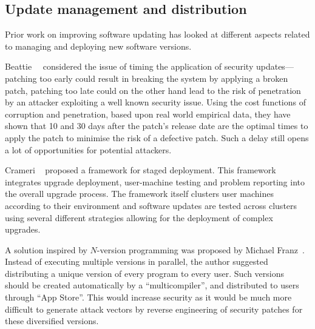 \subsection{Update management and distribution}

Prior work on improving software updating has looked at different aspects
related to managing and deploying new software versions.

Beattie~\etal~\cite{beattie2002} considered the issue of timing the
application of security updates---patching too early could result in breaking
the system by applying a broken patch, patching too late could on the other
hand lead to the risk of penetration by an attacker exploiting a well known
security issue. Using the cost functions of corruption and penetration, based
upon real world empirical data, they have shown that 10 and 30 days after the
patch's release date are the optimal times to apply the patch to minimise the
risk of a defective patch.  Such a delay still opens a lot of opportunities for
potential attackers.

Crameri \etal~\cite{crameri:updates} proposed a framework for staged
deployment. This framework integrates upgrade deployment, user-machine testing
and problem reporting into the overall upgrade process. The framework itself
clusters user machines according to their environment and software updates are
tested across clusters using several different strategies allowing for the
deployment of complex upgrades.

A solution inspired by $N$-version programming was proposed by Michael
Franz~\cite{unibus:nspw10}. Instead of executing multiple versions in parallel,
the author suggested distributing a unique version of every program to every
user. Such versions should be created automatically by a ``multicompiler'',
and distributed to users through ``App Store''. This would increase security as
it would be much more difficult to generate attack vectors by reverse
engineering of security patches for these diversified versions.


